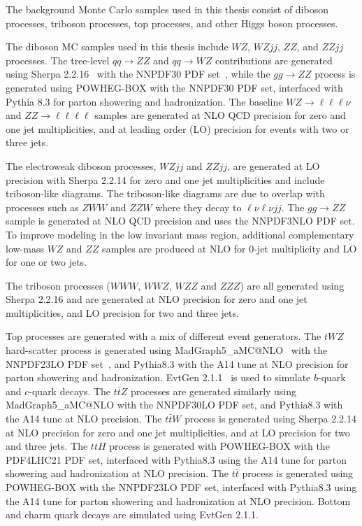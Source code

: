 The background Monte Carlo samples used in this thesis consist of diboson processes, triboson processes, top processes, and other Higgs boson processes.

The diboson MC samples used in this thesis include $WZ$, $WZjj$, $ZZ$, and $ZZjj$ processes. The tree-level $qq \rightarrow ZZ$ and $qq \rightarrow WZ$ contributions are generated using Sherpa 2.2.16~\cite{Sherpa:2019gpd} with the NNPDF30 PDF set~\cite{NNPDF:2014otw}, while the $gg \rightarrow ZZ$ process is generated using POWHEG-BOX with the NNPDF30 PDF set, interfaced with Pythia 8.3 for parton showering and hadronization. The baseline $WZ \rightarrow \ell\ell\ell\nu$ and $ZZ \rightarrow \ell\ell\ell\ell$ samples are generated at NLO QCD precision for zero and one jet multiplicities, and at leading order (LO) precision for events with two or three jets.

The electroweak diboson processes, $WZjj$ and $ZZjj$, are generated at LO precision with Sherpa 2.2.14 for zero and one jet multiplicities and include triboson-like diagrams. The triboson-like diagrams are due to overlap with processes such as $ZWW$ and $ZZW$ where they decay to $\ell\nu\ell\nu jj$. The $gg \rightarrow ZZ$ sample is generated at NLO QCD precision and uses the NNPDF3NLO PDF set. To improve modeling in the low invariant mass region, additional complementary low-mass $WZ$ and $ZZ$ samples are produced at NLO for 0-jet multiplicity and LO for one or two jets.

The triboson processes ($WWW$, $WWZ$, $WZZ$ and $ZZZ$) are all generated using Sherpa 2.2.16 and are generated at NLO precision for zero and one jet multiplicities, and LO precision for two and three jets.

Top processes are generated with a mix of different event generators. The $tWZ$ hard-scatter process is generated using MadGraph5\_aMC@NLO~\cite{Alwall:2011uj} with the NNPDF23LO PDF set~\cite{Ball:2012cx}, and Pythia8.3 with the A14 tune at NLO precision for parton showering and hadronization. EvtGen 2.1.1~\cite{Lange:2001uf} is used to simulate $b$-quark and $c$-quark decays. The $t\bar{t}Z$ processes are generated similarly using MadGraph5\_aMC@NLO with the NNPDF30LO PDF set, and Pythia8.3 with the A14 tune at NLO precision. The $t\bar{t}W$ process is generated using Sherpa 2.2.14 at NLO precision for zero and one jet multiplicities, and at LO precision for two and three jets. The $ttH$ process is generated with POWHEG-BOX with the PDF4LHC21 PDF set, interfaced with Pythia8.3 using the A14 tune for parton showering and hadronization at NLO precision. The $t\bar{t}$ process is generated using POWHEG-BOX with the NNPDF23LO PDF set, interfaced with Pythia8.3 using the A14 tune for parton showering and hadronization at NLO precision. Bottom and charm quark decays are simulated using EvtGen 2.1.1.


